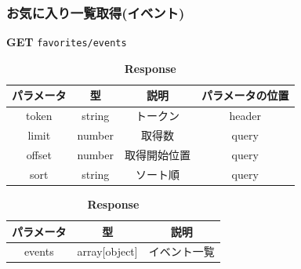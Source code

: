 \subsubsection*{お気に入り一覧取得(イベント)}
\textbf{GET} \texttt{favorites/events}
\begin{table}[H]
  \begin{minipage}
    {0.5\hsize}
    \centering
    \captionsetup{labelformat=empty,labelsep=none}
    \caption{\textbf{Request}}
    \small
    \begin{tabular}{|c|c|c|c|} \hline
      パラメータ  & 型      & 説明     & パラメータの位置 \\ \hline \hline
      token  & string & トークン   & header   \\ \hline
      limit  & number & 取得数    & query    \\ \hline
      offset & number & 取得開始位置 & query    \\ \hline
      sort   & string & ソート順   & query    \\ \hline
    \end{tabular}
  \end{minipage}
  \begin{minipage}
    {0.5\hsize}
    \centering
    \captionsetup{labelformat=empty,labelsep=none}
    \caption{\textbf{Response}}
    \begin{tabular}{|c|c|c|} \hline
      パラメータ  & 型             & 説明     \\ \hline \hline
      events & array[object] & イベント一覧 \\ \hline
    \end{tabular}
  \end{minipage}
\end{table}

